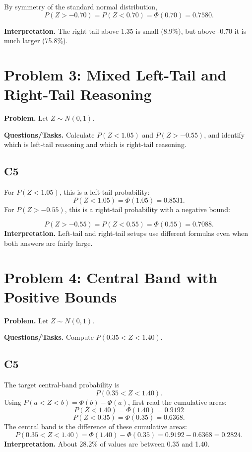 	By symmetry of the standard normal distribution,
	\[
	P(Z>-0.70)=P(Z<0.70)=\Phi(0.70)=0.7580.
	\]
	
	\textbf{Interpretation.} The right tail above 1.35 is small (8.9\%), but above -0.70 it is much larger (75.8\%).
	
	\section{Problem 3: Mixed Left-Tail and Right-Tail Reasoning}
\textbf{Problem.} Let \(Z\sim N(0,1)\).

\textbf{Questions/Tasks.} Calculate \(P(Z<1.05)\) and \(P(Z>-0.55)\), and identify which is left-tail reasoning and which is right-tail reasoning.

\subsection*{C5}
For \(P(Z<1.05)\), this is a left-tail probability:
\[
P(Z<1.05)=\Phi(1.05)=0.8531.
\]
For \(P(Z>-0.55)\), this is a right-tail probability with a negative bound:

\begin{center}
\begin{minipage}{0.48\textwidth}
\centering
{}
\end{minipage}
\hfill
\begin{minipage}{0.48\textwidth}
\centering
{}
\end{minipage}
\end{center}

\[
P(Z>-0.55)=P(Z<0.55)=\Phi(0.55)=0.7088.
\]
\textbf{Interpretation.} Left-tail and right-tail setups use different formulas even when both answers are fairly large.

\section{Problem 4: Central Band with Positive Bounds}
\textbf{Problem.} Let \(Z\sim N(0,1)\).

\textbf{Questions/Tasks.} Compute \(P(0.35<Z<1.40)\).

\subsection*{C5}
The target central-band probability is
\[
P(0.35<Z<1.40).
\]
Using \(P(a<Z<b)=\Phi(b)-\Phi(a)\), first read the cumulative areas:
\[
P(Z<1.40)=\Phi(1.40)=0.9192
\]
\[
P(Z<0.35)=\Phi(0.35)=0.6368.
\]
The central band is the difference of these cumulative areas:
\[
P(0.35<Z<1.40)=\Phi(1.40)-\Phi(0.35)=0.9192-0.6368=0.2824.
\]
\textbf{Interpretation.} About 28.2\% of values are between 0.35 and 1.40.

